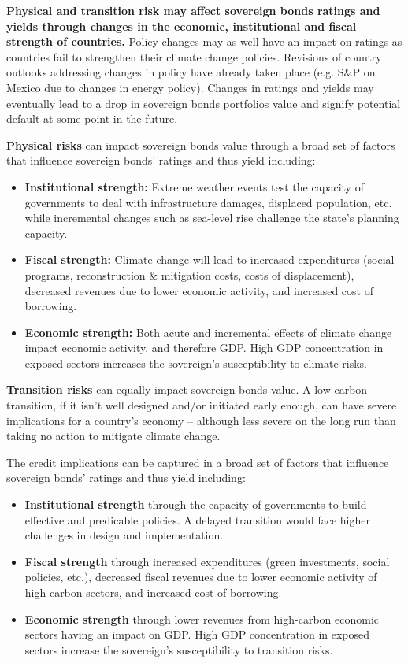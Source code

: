 \documentclass[10pt,table,a4]{article}\usepackage[]{graphicx}\usepackage[]{color}
\begin{document}
\begin{multicols}{2}

\textbf{Physical and transition risk may affect sovereign bonds ratings and yields through changes in the economic, institutional and fiscal strength of countries.} Policy changes may as well have an impact on ratings as countries fail to strengthen their climate change policies. Revisions of country outlooks addressing changes in policy have already taken place (e.g. S\&P on Mexico due to changes in energy policy). Changes in ratings and yields may eventually lead to a drop in sovereign bonds portfolios value and signify potential default at some point in the future. 

\textbf{Physical risks} can impact sovereign bonds value through a broad set of factors that influence sovereign bonds’ ratings and thus yield including:

	\begin{itemize}
\item{\textbf{Institutional strength:} Extreme weather events test the capacity of governments to deal with infrastructure damages, displaced population, etc. while incremental changes such as sea-level rise challenge the state’s planning capacity.}
\item{\textbf{Fiscal strength:} Climate change will lead to increased expenditures (social programs, reconstruction \& mitigation costs, costs of displacement), decreased revenues due to lower economic activity, and increased cost of borrowing.}
\item{\textbf{Economic strength:} Both acute and incremental effects of climate change impact economic activity, and therefore GDP. High GDP concentration in exposed sectors increases the sovereign’s susceptibility to climate risks.}
	\end{itemize}

\textbf{Transition risks} can equally impact sovereign bonds value. A low-carbon transition, if it isn’t well designed and/or initiated early enough, can have severe implications for a country’s economy – although less severe on the long run than taking no action to mitigate climate change. 

The credit implications can be captured in a broad set of factors that influence sovereign bonds’ ratings and thus yield including:

	\begin{itemize}
\item{\textbf{Institutional strength} through the capacity of governments to build effective and predicable policies. A delayed transition would face higher challenges in design and implementation.}
\item{\textbf{Fiscal strength} through increased expenditures (green investments, social policies, etc.), decreased fiscal revenues due to lower economic activity of high-carbon sectors, and increased cost of borrowing.} 
\item{\textbf{Economic strength} through lower revenues from high-carbon economic sectors having an impact on GDP. High GDP concentration in exposed sectors increase the sovereign’s susceptibility to transition risks.}
	\end{itemize}
		

\end{multicols}
\end{document}
